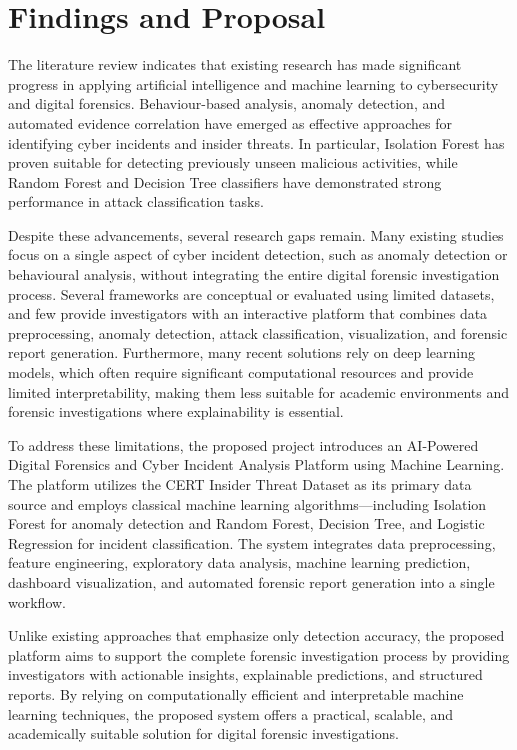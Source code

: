 \section{Findings and Proposal}
The literature review indicates that existing research has made significant progress in applying artificial intelligence and machine learning to cybersecurity and digital forensics. Behaviour-based analysis, anomaly detection, and automated evidence correlation have emerged as effective approaches for identifying cyber incidents and insider threats. In particular, Isolation Forest has proven suitable for detecting previously unseen malicious activities, while Random Forest and Decision Tree classifiers have demonstrated strong performance in attack classification tasks.

Despite these advancements, several research gaps remain. Many existing studies focus on a single aspect of cyber incident detection, such as anomaly detection or behavioural analysis, without integrating the entire digital forensic investigation process. Several frameworks are conceptual or evaluated using limited datasets, and few provide investigators with an interactive platform that combines data preprocessing, anomaly detection, attack classification, visualization, and forensic report generation. Furthermore, many recent solutions rely on deep learning models, which often require significant computational resources and provide limited interpretability, making them less suitable for academic environments and forensic investigations where explainability is essential.

To address these limitations, the proposed project introduces an AI-Powered Digital Forensics and Cyber Incident Analysis Platform using Machine Learning. The platform utilizes the CERT Insider Threat Dataset as its primary data source and employs classical machine learning algorithms---including Isolation Forest for anomaly detection and Random Forest, Decision Tree, and Logistic Regression for incident classification. The system integrates data preprocessing, feature engineering, exploratory data analysis, machine learning prediction, dashboard visualization, and automated forensic report generation into a single workflow.

Unlike existing approaches that emphasize only detection accuracy, the proposed platform aims to support the complete forensic investigation process by providing investigators with actionable insights, explainable predictions, and structured reports. By relying on computationally efficient and interpretable machine learning techniques, the proposed system offers a practical, scalable, and academically suitable solution for digital forensic investigations.

